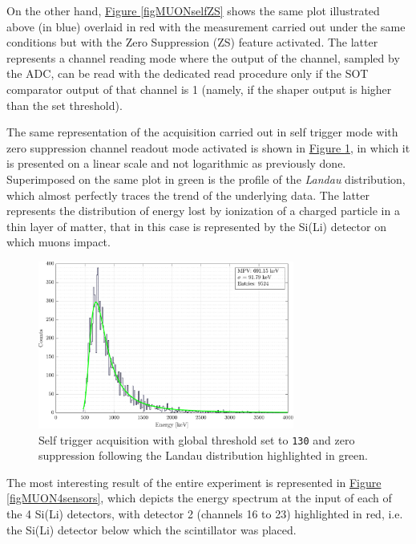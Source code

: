 \par
On the other hand, \hyperref[figMUONselfZS]{Figure \ref{figMUONselfZS}} shows the same plot illustrated above (in blue) overlaid in red with the measurement carried out under the same conditions but with the Zero Suppression (ZS) feature activated. The latter represents a channel reading mode where the output of the channel, sampled by the ADC, can be read with the dedicated read procedure only if the SOT comparator output of that channel is 1 (namely, if the shaper output is higher than the
set threshold).

\par
The same representation of the acquisition carried out in self trigger mode with zero suppression channel readout mode activated is shown in \hyperref[figMUONlandau]{Figure \ref{figMUONlandau}}, in which it is presented on a linear scale and not logarithmic as previously done. Superimposed on the same plot in green is the profile of the \textit{Landau} distribution, which almost perfectly traces the trend of the underlying data. The latter represents the distribution of energy lost by ionization of a charged particle in a thin layer of matter, that in this case is represented by the Si(Li) detector on which muons impact.

\begin{figure}[h!]
    \centering
    \includegraphics[width=0.75\textwidth]{Images/chap3/results/muons/incoming_energy_thr130_ZS_landau_keV.pdf} %
    \caption{Self trigger acquisition with global threshold set to \texttt{130} and zero suppression following the Landau distribution highlighted in green.}
    \label{figMUONlandau}
\end{figure}

\par
The most interesting result of the entire experiment is represented in \hyperref[figMUON4sensors]{Figure \ref{figMUON4sensors}}, which depicts the energy spectrum at the input of each of the 4 Si(Li) detectors, with detector 2 (channels 16 to 23) highlighted in red, i.e. the Si(Li) detector below which the scintillator was placed.

